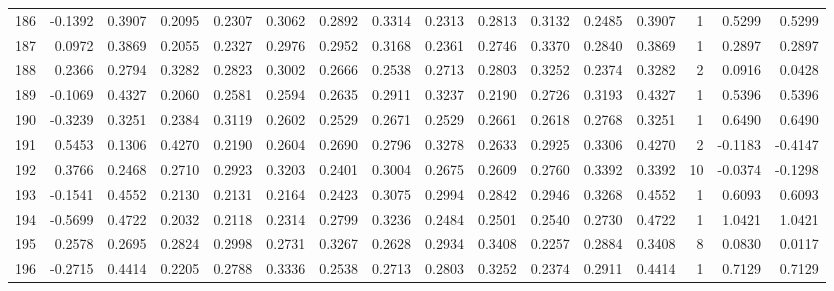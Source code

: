 \begin{tabular}{lrrrrrrrrrrrrrrr}
186 &     -0.1392 &  0.3907 &  0.2095 &  0.2307 &  0.3062 &  0.2892 &  0.3314 &  0.2313 &  0.2813 &  0.3132 &   0.2485 &     0.3907 &      1 &                    0.5299 &                     0.5299 \\
187 &      0.0972 &  0.3869 &  0.2055 &  0.2327 &  0.2976 &  0.2952 &  0.3168 &  0.2361 &  0.2746 &  0.3370 &   0.2840 &     0.3869 &      1 &                    0.2897 &                     0.2897 \\
188 &      0.2366 &  0.2794 &  0.3282 &  0.2823 &  0.3002 &  0.2666 &  0.2538 &  0.2713 &  0.2803 &  0.3252 &   0.2374 &     0.3282 &      2 &                    0.0916 &                     0.0428 \\
189 &     -0.1069 &  0.4327 &  0.2060 &  0.2581 &  0.2594 &  0.2635 &  0.2911 &  0.3237 &  0.2190 &  0.2726 &   0.3193 &     0.4327 &      1 &                    0.5396 &                     0.5396 \\
190 &     -0.3239 &  0.3251 &  0.2384 &  0.3119 &  0.2602 &  0.2529 &  0.2671 &  0.2529 &  0.2661 &  0.2618 &   0.2768 &     0.3251 &      1 &                    0.6490 &                     0.6490 \\
191 &      0.5453 &  0.1306 &  0.4270 &  0.2190 &  0.2604 &  0.2690 &  0.2796 &  0.3278 &  0.2633 &  0.2925 &   0.3306 &     0.4270 &      2 &                   -0.1183 &                    -0.4147 \\
192 &      0.3766 &  0.2468 &  0.2710 &  0.2923 &  0.3203 &  0.2401 &  0.3004 &  0.2675 &  0.2609 &  0.2760 &   0.3392 &     0.3392 &     10 &                   -0.0374 &                    -0.1298 \\
193 &     -0.1541 &  0.4552 &  0.2130 &  0.2131 &  0.2164 &  0.2423 &  0.3075 &  0.2994 &  0.2842 &  0.2946 &   0.3268 &     0.4552 &      1 &                    0.6093 &                     0.6093 \\
194 &     -0.5699 &  0.4722 &  0.2032 &  0.2118 &  0.2314 &  0.2799 &  0.3236 &  0.2484 &  0.2501 &  0.2540 &   0.2730 &     0.4722 &      1 &                    1.0421 &                     1.0421 \\
195 &      0.2578 &  0.2695 &  0.2824 &  0.2998 &  0.2731 &  0.3267 &  0.2628 &  0.2934 &  0.3408 &  0.2257 &   0.2884 &     0.3408 &      8 &                    0.0830 &                     0.0117 \\
196 &     -0.2715 &  0.4414 &  0.2205 &  0.2788 &  0.3336 &  0.2538 &  0.2713 &  0.2803 &  0.3252 &  0.2374 &   0.2911 &     0.4414 &      1 &                    0.7129 &                     0.7129 \\

\end{tabular}
